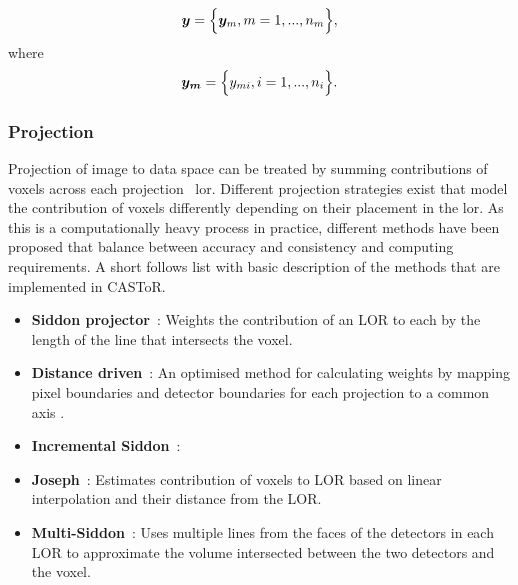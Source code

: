 \begin{equation}
   \bm{y} = \Big\{ {\bm{y}_m,m=1,...,n_m} \Big\} \\,
\end{equation}
where
\begin{equation}
   \bm{y_m} = \Big\{ {y_{mi},i=1,...,n_i} \Big\} \\.
\end{equation}


\subsubsection{Projection}
Projection of image to data space can be treated by summing contributions of voxels across each projection ~\gls{lor}. Different projection strategies exist that model the contribution of voxels differently depending on their placement in the \gls{lor}. As this is a computationally heavy process in practice, different methods have been proposed that balance between accuracy and consistency and computing requirements. A short follows list with basic description of the methods that are implemented in CASToR.

\begin{itemize}
\item  \textbf{Siddon projector}~\cite{Siddon1985}: Weights the contribution of an LOR to each by the length of the line that intersects the voxel.
\item  \textbf{Distance driven}~\cite{DeMan2004}: An optimised method for calculating weights by mapping pixel boundaries and detector boundaries for each projection to a common axis .
\item  \textbf{Incremental Siddon}~\cite{Jacobs2015}:
\item  \textbf{Joseph}~\cite{Joseph1982}: Estimates contribution of voxels to LOR based on linear interpolation and their distance from the LOR. 
\item  \textbf{Multi-Siddon}~\cite{Moehrs2008}: Uses multiple lines from the faces of the detectors in each LOR to approximate the volume intersected between the two detectors and the voxel.
\end{itemize}

